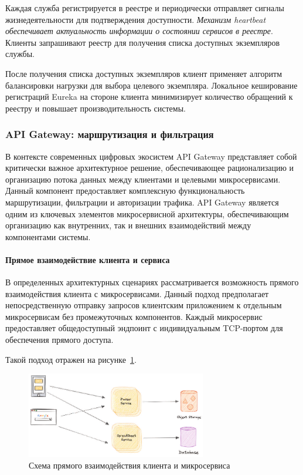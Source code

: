 Каждая служба регистрируется в реестре и периодически отправляет сигналы жизнедеятельности для подтверждения доступности. \textit{Механизм heartbeat обеспечивает актуальность информации о состоянии сервисов в реестре}.
Клиенты запрашивают реестр для получения списка доступных экземпляров службы.

После получения списка доступных экземпляров клиент применяет алгоритм балансировки нагрузки для выбора целевого экземпляра. Локальное кеширование регистраций Eureka на стороне клиента минимизирует количество обращений к реестру и повышает производительность системы.

\subsubsection{API Gateway: маршрутизация и фильтрация}

В контексте современных цифровых экосистем API Gateway представляет собой критически важное архитектурное решение, обеспечивающее рационализацию и организацию потока данных между клиентами и целевыми микросервисами.
Данный компонент предоставляет комплексную функциональность маршрутизации, фильтрации и авторизации трафика. API Gateway является одним из ключевых элементов микросервисной архитектуры, обеспечивающим организацию как внутренних, так и внешних взаимодействий между компонентами системы.

\paragraph{Прямое взаимодействие клиента и сервиса}

В определенных архитектурных сценариях рассматривается возможность прямого взаимодействия клиента с микросервисами.
Данный подход предполагает непосредственную отправку запросов клиентским приложением к отдельным микросервисам без промежуточных компонентов.
Каждый микросервис предоставляет общедоступный эндпоинт с индивидуальным TCP-портом для обеспечения прямого доступа.

Такой подход отражен на рисунке~\ref{fig:direct_client_service}.
\begin{figure}[htbp]
    \centering
    \includegraphics[width=0.7\textwidth]{Dissertation/images/wo_gateway}
    \caption{Схема прямого взаимодействия клиента и микросервиса}
    \label{fig:direct_client_service}
\end{figure}

